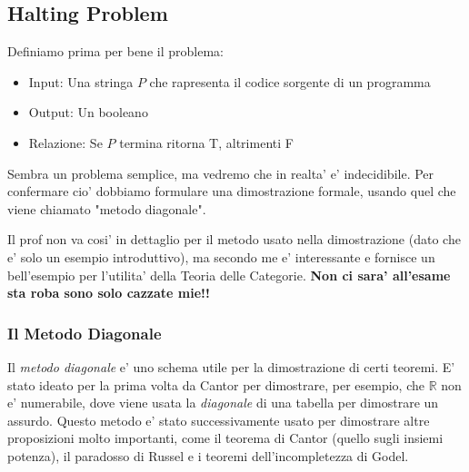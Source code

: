 
\subsection{Halting Problem}
Definiamo prima per bene il problema:
\begin{itemize}
\item Input: Una stringa $ P $ che rapresenta il codice sorgente di un programma
\item Output: Un booleano
\item Relazione: Se $ P $ termina ritorna T, altrimenti F
\end{itemize}

Sembra un problema semplice, ma vedremo che in realta' e' indecidibile. Per confermare cio' dobbiamo formulare una dimostrazione formale, usando quel che viene chiamato "metodo diagonale".

Il prof non va cosi' in dettaglio per il metodo usato nella dimostrazione (dato che e' solo un esempio introduttivo), ma secondo me e' interessante e fornisce un bell'esempio per l'utilita' della Teoria delle Categorie. \textbf{Non ci sara' all'esame sta roba sono solo cazzate mie!!}

\subsubsection{Il Metodo Diagonale}
Il \textit{metodo diagonale} e' uno schema utile per la dimostrazione di certi teoremi. E' stato ideato per la prima volta da Cantor per dimostrare, per esempio, che $ \mathbb{R} $ non e' numerabile, dove viene usata la \textit{diagonale} di una tabella per dimostrare un assurdo. Questo metodo e' stato successivamente usato per dimostrare altre proposizioni molto importanti, come il teorema di Cantor (quello sugli insiemi potenza), il paradosso di Russel e i teoremi dell'incompletezza di Godel.

